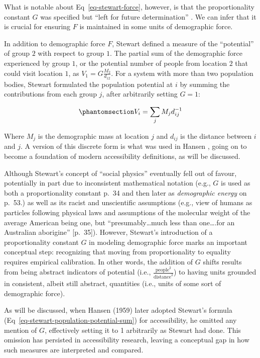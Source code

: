 \documentclass[
  10pt,
  letterpaper,
]{article}
\begin{document}
What is notable about Eq~\ref{eq-stewart-force}, however, is that the
proportionality constant \(G\) was specified but ``left for future
determination''
\citep[p.~34]{stewartDemographicGravitationEvidence1948}. We can infer
that it is crucial for ensuring \(F\) is maintained in some units of
demographic force.

In addition to demographic force \(F\), Stewart defined a measure of the
``potential'' of group \(2\) with respect to group \(1\). The partial
sum of the demographic force experienced by group \(1\), or the
potential number of people from location \(2\) that could visit location
\(1\), as \(V_1 = G\frac{M_2}{d_{12}}\). For a system with more than two
population bodies, Stewart formulated the population potential at \(i\)
by summing the contributions from each group \(j\), after arbitrarily
setting \(G=1\):

\begin{equation}\phantomsection\label{eq-stewart-population-potential-sum}{
V_i = \sum_j M_jd_{ij}^{-1}
}\end{equation}

\noindent Where \(M_j\) is the demographic mass at location \(j\) and
\(d_{ij}\) is the distance between \(i\) and \(j\). A version of this
discrete form is what was used in Hansen \citep{hansen1959}, going on to
become a foundation of modern accessibility definitions, as will be
discussed.

Although Stewart's concept of ``social physics'' eventually fell out of
favour, potentially in part due to inconsistent mathematical notation
(e.g., \(G\) is used as both a proportionality constant p.~34 and then
later as \emph{demographic energy} on p.~53.) as well as its racist and
unscientific assumptions (e.g., view of humans as particles following
physical laws and assumptions of the molecular weight of the average
American being one, but ``presumably\ldots much less than one\ldots.for
an Australian aborigine'' {[}p.~35{]}). However, Stewart's introduction
of a proportionality constant \(G\) in modeling demographic force marks
an important conceptual step: recognizing that moving from
proportionality to equality requires empirical calibration. In other
words, the addition of \(G\) shifts results from being abstract
indicators of potential (i.e.,
\(\frac{\text{people}^2}{\text{distance}^{2}}\)) to having units
grounded in consistent, albeit still abstract, quantities (i.e., units
of some sort of demographic force).

As will be discussed, when Hansen (1959) \citep{hansen1959} later
adopted Stewart's formula (Eq~\ref{eq-stewart-population-potential-sum})
for accessibility, he omitted any mention of \(G\), effectively setting
it to 1 arbitrarily as Stewart had done. This omission has persisted in
accessibility research, leaving a conceptual gap in how such measures
are interpreted and compared.
\end{document}
